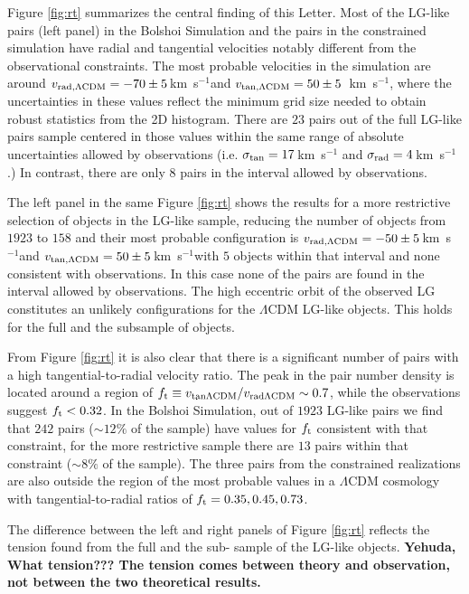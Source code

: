 \documentclass{emulateapj}
\newcommand{\kms}{\,km~s$^{-1}$}
\begin{document}
Figure \ref{fig:rt} summarizes the central finding of this
Letter. Most of the LG-like pairs (left panel) in the Bolshoi
Simulation and the pairs in the constrained simulation have radial and
tangential velocities notably different from the observational
constraints.  The most probable velocities in the simulation are
around $v_{\rm rad,\Lambda CDM} = -70\pm5$\kms and $v_{\rm tan,\Lambda
  CDM} = 50\pm5$ \kms, where the uncertainties in these values reflect
the minimum grid size needed to obtain robust statistics from the 2D
histogram. There are $23$ pairs out of the full LG-like pairs sample
centered in those values within the same range of absolute
uncertainties allowed by observations (i.e. $\sigma_{\rm tan}=17$\kms
and $\sigma_{\rm rad}=4$\kms.) In contrast, there are only $8$ pairs
in the interval allowed by observations.  

The left panel in the same Figure \ref{fig:rt} shows the results for a
more restrictive selection of objects in the LG-like sample, reducing
the number of objects from  $1923$   to $158$ and their most probable
configuration is $v_{\rm rad,\Lambda CDM} = -50\pm5$\kms and $v_{\rm
  tan,\Lambda CDM} = 50\pm5$\kms with $5$ objects within that interval
and none consistent with observations. In this case none of the pairs
are found in the interval allowed by observations. The high eccentric
orbit of the observed LG  constitutes an unlikely configurations for
the $\Lambda$CDM LG-like objects. This holds for the full and the
subsample of objects.  


From Figure \ref{fig:rt} it is also clear that there is a significant
number of pairs with a high tangential-to-radial velocity ratio. The
peak in the pair number density is located around a region of $f_{\rm
  t}\equiv v_{\rm tan \Lambda CDM}/v_{\rm rad \Lambda CDM}\sim 0.7$,
while the observations suggest $f_{\rm t}<0.32$. In the Bolshoi
Simulation, out of $1923$ LG-like pairs we find that $242$ pairs
($\sim 12\%$ of the sample) have values for $f_{\rm t}$ consistent
with that constraint, for the more restrictive sample there are $13$
pairs within that constraint ($\sim 8\%$ of the sample). The three
pairs from the constrained realizations are also outside the region of
the most probable values in a $\Lambda$CDM cosmology with
tangential-to-radial ratios of $f_{\rm t}= 0.35, 0.45, 0.73$. 

The difference between the left and right panels of Figure
\ref{fig:rt} reflects  the tension found from the full and the sub-
sample of the LG-like objects. {\bf Yehuda, What tension??? The
  tension comes between theory and observation, not between the two
  theoretical results.} 
\end{document}
